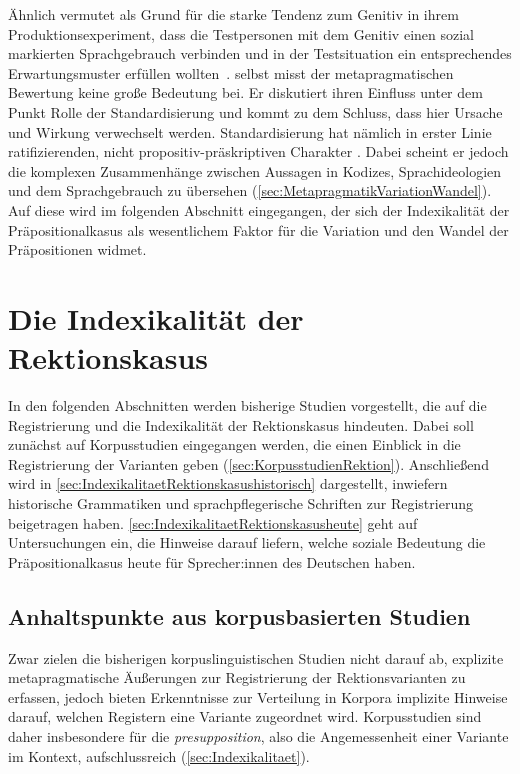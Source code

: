 Ähnlich vermutet \citeauthor{Becker2011} als Grund für die starke Tendenz zum Genitiv in ihrem Produktionsexperiment, {\glqq}dass die Testpersonen mit dem Genitiv einen sozial markierten Sprachgebrauch verbinden und in der Testsituation ein entsprechendes Erwartungsmuster erf{\"u}llen wollten{\grqq}~\citep[211]{Becker2011}. 
\citet[218]{DiMeola2000} selbst misst der metapragmatischen Bewertung keine große Bedeutung bei. 
Er diskutiert ihren Einfluss unter dem Punkt {\glqq}Rolle der Standardisierung{\grqq} und kommt zu dem Schluss, dass hier {\glqq}Ursache und Wirkung verwechselt werden. Standardisierung hat n{\"a}mlich in erster Linie ratifizierenden, nicht propositiv-pr{\"a}skriptiven Charakter{\grqq} \citep[216]{DiMeola2000}. 
Dabei scheint er jedoch die komplexen Zusammenhänge zwischen Aussagen in Kodizes, Sprachideologien und dem Sprachgebrauch zu übersehen (\autoref{sec:MetapragmatikVariationWandel}). 
Auf diese wird im folgenden Abschnitt eingegangen, der sich der Indexikalität der Präpositionalkasus als wesentlichem Faktor für die Variation und den Wandel der Präpositionen widmet. 
\section{Die Indexikalität der Rektionskasus} \label{sec:IndexikalitaetRektionskasus}
In den folgenden Abschnitten werden bisherige Studien vorgestellt, die auf die Registrierung und die Indexikalität der Rektionskasus hindeuten. 
Dabei soll zunächst auf Korpusstudien eingegangen werden, die einen Einblick in die Registrierung der Varianten geben (\autoref{sec:KorpusstudienRektion}). 
Anschließend wird in \autoref{sec:IndexikalitaetRektionskasushistorisch} dargestellt, inwiefern historische Grammatiken und sprachpflegerische Schriften zur Registrierung beigetragen haben.  
\autoref{sec:IndexikalitaetRektionskasusheute} geht auf Untersuchungen ein, die Hinweise darauf liefern, welche soziale Bedeutung die Präpositionalkasus heute für Sprecher:innen des Deutschen haben. 
\subsection{Anhaltspunkte aus korpusbasierten Studien}
\label{sec:KorpusstudienRektion}
Zwar zielen die bisherigen korpuslinguistischen Studien nicht darauf ab, explizite metapragmatische Äußerungen zur Registrierung der Rektionsvarianten zu erfassen, jedoch bieten Erkenntnisse zur Verteilung in Korpora implizite Hinweise darauf, welchen Registern eine Variante zugeordnet wird. 
Korpusstudien sind daher insbesondere für die \textit{presupposition}, also die Angemessenheit einer Variante im Kontext, aufschlussreich (\autoref{sec:Indexikalitaet}). 

